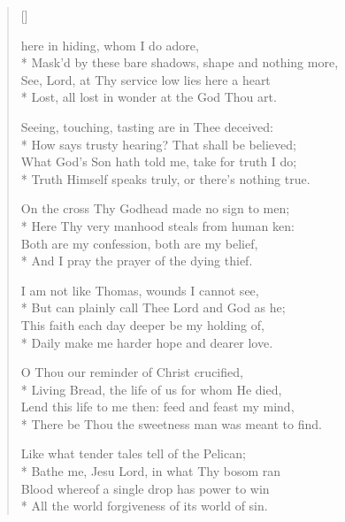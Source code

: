 \newHymn
{}
\settowidth{\versewidth}{Masked by these bare shadows, shape and
nothin}
\begin{verse}[\versewidth]

 here in hiding, whom I do adore,\\*
   Mask'd by these bare shadows, shape and nothing more,\\
      See, Lord, at Thy service low lies here a heart     \\*
       Lost, all lost in wonder at the God Thou art.      
       \pointorig
                                                          
      Seeing, touching, tasting are in Thee deceived:     \\*
     How says trusty hearing? That shall be believed;     \\
     What God's Son hath told me, take for truth I do;     \\*
    Truth Himself speaks truly, or there's nothing true.   
              
       On the cross Thy Godhead made no sign to men;      \\*
       Here Thy very manhood steals from human ken:       \\
        Both are my confession, both are my belief,       \\*
         And I pray the prayer of the dying thief.        
             
 I am not like Thomas, wounds I cannot see, \\*
       But can plainly call Thee Lord and God as he;   \\
This faith each day deeper be my holding of,\\*
        Daily make me harder hope and dearer love.        
             
         O Thou our reminder of Christ crucified,         \\*
      Living Bread, the life of us for whom He died,      \\
    Lend this life to me then: feed and feast my mind,    \\*
    There be Thou the sweetness man was meant to find.    
             
        Like what tender tales tell of the Pelican; \\*
        Bathe me, Jesu Lord, in what Thy bosom ran   \\
       Blood whereof a single drop has power to win  \\*
      All the world forgiveness of its world of sin.      
             

\end{verse}
